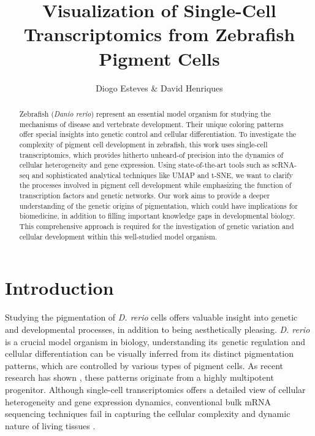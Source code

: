 \documentclass[runningheads]{llncs}
\begin{document}
\title{Visualization of Single-Cell Transcriptomics from Zebrafish Pigment Cells}

\author{Diogo Esteves \& David Henriques}


\maketitle

\begin{abstract}
Zebrafish (\textit{Danio rerio}) represent an essential model organism for studying the mechanisms of disease and vertebrate development. Their unique coloring patterns offer special insights into genetic control and cellular differentiation. To investigate the complexity of pigment cell development in zebrafish, this work uses single-cell transcriptomics, which provides hitherto unheard-of precision into the dynamics of cellular heterogeneity and gene expression. Using state-of-the-art tools such as scRNA-seq and sophisticated analytical techniques like UMAP and t-SNE, we want to clarify the processes involved in pigment cell development while emphasizing the function of transcription factors and genetic networks. Our work aims to provide a deeper understanding of the genetic origins of pigmentation, which could have implications for biomedicine, in addition to filling important knowledge gaps in developmental biology. This comprehensive approach is required for the investigation of genetic variation and cellular development within this well-studied model organism.
\end{abstract}

\section{Introduction}
\lettrine[]{S}{}tudying the pigmentation of \textit{D. rerio} cells offers valuable insight into genetic and developmental processes, in addition to being aesthetically pleasing. \textit{D. rerio} is a crucial model organism in biology, understanding its genetic regulation and cellular differentiation can be visually inferred from its distinct pigmentation patterns, which are controlled by various types of pigment cells. As recent research has shown \cite{subkhankulova2023zebrafish,howard2021atlas}, these patterns originate from a highly multipotent progenitor. Although single-cell transcriptomics offers a detailed view of cellular heterogeneity and gene expression dynamics, conventional bulk mRNA sequencing techniques fail in capturing the cellular complexity and dynamic nature of living tissues \cite{nayak2021hitchhiker}.
\end{document}

